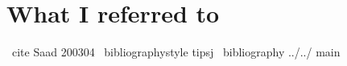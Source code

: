 




\section{What I referred to}
\ cite {Saad 200304}
\ bibliographystyle {tipsj}
\ bibliography {../../ main}
\fi



